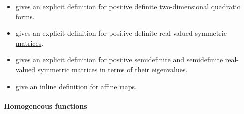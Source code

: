 \begin{remark}
\begin{itemize}
    \item {} gives an explicit definition for positive definite two-dimensional quadratic forms.

    \item {} gives an explicit definition for positive definite real-valued symmetric \hyperref[def:array/matrix]{matrices}.

    \item {} gives an explicit definition for positive semidefinite and semidefinite real-valued symmetric matrices in terms of their eigenvalues.

    \item {} give an inline definition for \hyperref[def:affine_operator]{affine maps}.
  \end{itemize}
\end{remark}

\paragraph{Homogeneous functions}

